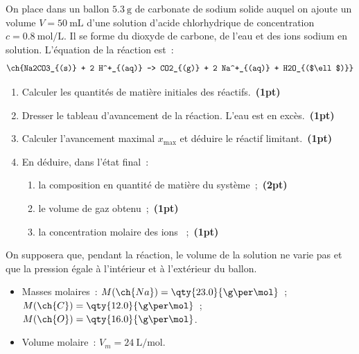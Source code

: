 On place dans un ballon $\qty{5.3}{\g}$ de carbonate de sodium
solide  auquel on ajoute un volume $V=\qty{50}{\mL}$ d'une solution
d'acide chlorhydrique de concentration $c=\qty{0.8}{\mol\per\L}$. Il se forme du
dioxyde de carbone, de l'eau et des ions sodium en solution.
L'équation de la réaction est~:
\[
    \ch{Na2CO3_{(s)} + 2 H^+_{(aq)} -> CO2_{(g)} + 2 Na^+_{(aq)} + H2O_{($\ell$)}}
\]

\begin{enumerate}
    \item Calculer les quantités de matière initiales des
          réactifs.~\textbf{(1pt)}
    \item Dresser le tableau d'avancement de la réaction. L'eau est en
          excès.~\textbf{(1pt)}
    \item Calculer l'avancement maximal $x_{\max}$ et déduire le réactif
          limitant.~\textbf{(1pt)}
    \item En déduire, dans l'état final~:
          \begin{enumerate}
              \item la composition en quantité de matière du
                    système~;~\textbf{(2pt)}
              \item le volume de gaz obtenu~;~\textbf{(1pt)}
              \item la concentration molaire des ions
                    ~;~\textbf{(1pt)}
          \end{enumerate}
\end{enumerate}
On supposera que, pendant la réaction, le volume de la solution ne varie pas et
que la pression égale à l'intérieur et à l'extérieur du ballon.
\begin{donnees}
    \begin{itemize}
        \item Masses molaires~: $M(\ch{Na})=\qty{23.0}{\g\per\mol}$~;
              $M(\ch{C})=\qty{12.0}{\g\per\mol}$~;
              $M(\ch{O})=\qty{16.0}{\g\per\mol}$.
        \item Volume molaire~: $V_{m}=\qty{24}{\L\per\mol}$.
    \end{itemize}
\end{donnees}

